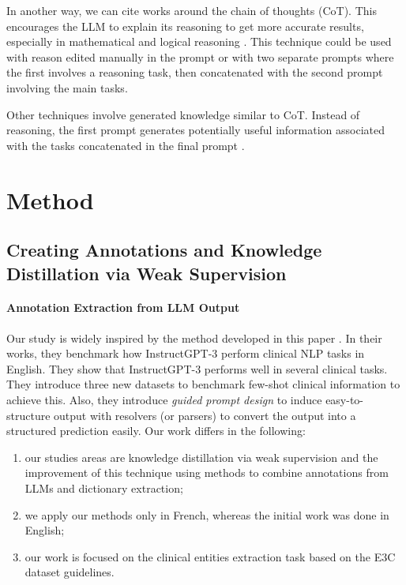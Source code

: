 In another way, we can cite works around the chain of thoughts (CoT). This encourages the LLM to explain its reasoning to get more accurate results, especially in mathematical and logical reasoning \citep{Wei2022ChainModels, Cobbe2021TrainingProblems}. This technique could be used with reason edited manually in the prompt or with two separate prompts where the first involves a reasoning task, then concatenated with the second prompt involving the main tasks.

Other techniques involve generated knowledge similar to CoT. Instead of reasoning, the first prompt generates potentially useful information associated with the tasks concatenated in the final prompt \citep{Liu2022GeneratedReasoning}.

\section{Method}

\subsection{Creating Annotations and Knowledge Distillation via Weak Supervision}
\paragraph{Annotation Extraction from LLM Output}
Our study is widely inspired by the method developed in this paper \citep{Agrawal2022LargeExtractors}. In their works, they benchmark how InstructGPT-3 \citep{Ouyang2022TrainingFeedback} perform clinical NLP tasks in English. They show that InstructGPT-3 performs well in several clinical tasks. They introduce three new datasets to benchmark few-shot clinical information to achieve this. Also, they introduce \textit{guided prompt design} to induce easy-to-structure output with resolvers (or parsers) to convert the output into a structured prediction easily. 
Our work differs in the following: 
\begin{enumerate}
    \item our studies areas are knowledge distillation via weak supervision and the improvement of this technique using methods to combine annotations from LLMs and dictionary extraction;
    \item we apply our methods only in French, whereas the initial work was done in English;
    \item our work is focused on the clinical entities extraction task based on the E3C dataset guidelines.
\end{enumerate}

